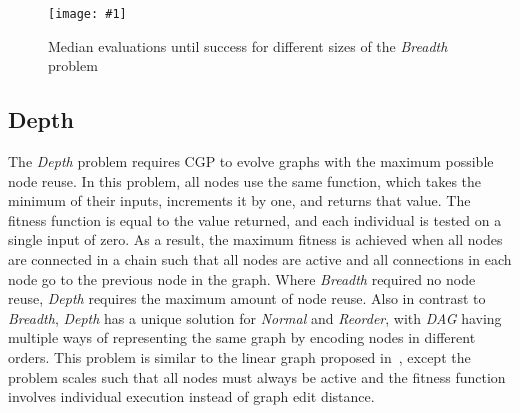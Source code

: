 \documentclass{sig-alternate}
\newcommand{\includegraphicsfit}[1]
{\texttt{[image: \#1]}}
\begin{document}
\begin{figure}
  \centering
  \includegraphicsfit{breadth}
  \caption{Median evaluations until success for different sizes of the \emph{Breadth} problem} 
  \label{fig-breadth}
\end{figure}

\subsection{Depth}
The \emph{Depth} problem requires CGP to evolve graphs with the maximum possible node
reuse.  In this problem, all nodes use the same function, which takes the minimum of
their inputs, increments it by one, and returns that value.  The fitness function is
equal to the value returned, and each individual is tested on a single input of zero.
As a result, the maximum fitness is achieved when all nodes are connected in a chain
such that all nodes are active and all connections in each node go to the previous node in the graph.
Where \emph{Breadth} required no node reuse, \emph{Depth} requires the maximum amount of node
reuse.  Also in contrast to \emph{Breadth}, \emph{Depth} has a unique solution for
\emph{Normal} and \emph{Reorder}, with \emph{DAG} having multiple ways of representing
the same graph by encoding nodes in different orders.  This problem is similar to the linear graph proposed
in~\cite{payne:2009:bias}, except the problem scales such that all nodes
must always be active and the fitness function involves individual execution instead of graph edit distance.
\end{document}

